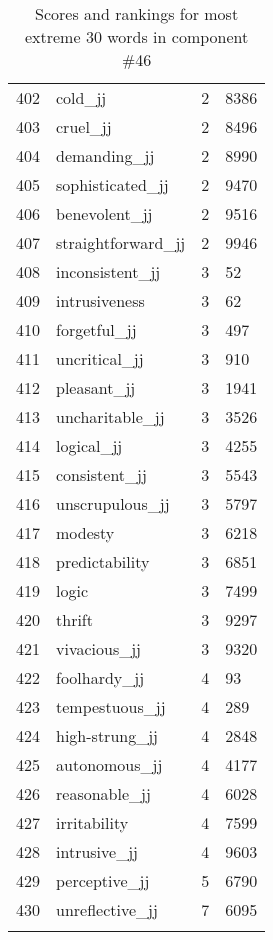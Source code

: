 \begin{longtable}[!htbp]{| rlr@{.}l |}
    402 & cold\_jj & 2 & 8386 \\
    403 & cruel\_jj & 2 & 8496 \\
    404 & demanding\_jj & 2 & 8990 \\
    405 & sophisticated\_jj & 2 & 9470 \\
    406 & benevolent\_jj & 2 & 9516 \\
    407 & straightforward\_jj & 2 & 9946 \\
    408 & inconsistent\_jj & 3 & 52 \\
    409 & intrusiveness & 3 & 62 \\
    410 & forgetful\_jj & 3 & 497 \\
    411 & uncritical\_jj & 3 & 910 \\
    412 & pleasant\_jj & 3 & 1941 \\
    413 & uncharitable\_jj & 3 & 3526 \\
    414 & logical\_jj & 3 & 4255 \\
    415 & consistent\_jj & 3 & 5543 \\
    416 & unscrupulous\_jj & 3 & 5797 \\
    417 & modesty & 3 & 6218 \\
    418 & predictability & 3 & 6851 \\
    419 & logic & 3 & 7499 \\
    420 & thrift & 3 & 9297 \\
    421 & vivacious\_jj & 3 & 9320 \\
    422 & foolhardy\_jj & 4 & 93 \\
    423 & tempestuous\_jj & 4 & 289 \\
    424 & high-strung\_jj & 4 & 2848 \\
    425 & autonomous\_jj & 4 & 4177 \\
    426 & reasonable\_jj & 4 & 6028 \\
    427 & irritability & 4 & 7599 \\
    428 & intrusive\_jj & 4 & 9603 \\
    429 & perceptive\_jj & 5 & 6790 \\
    430 & unreflective\_jj & 7 & 6095 \\
    \hline
    \caption{Scores and rankings for most extreme 30 words in component \#46} \\
\end{longtable}
